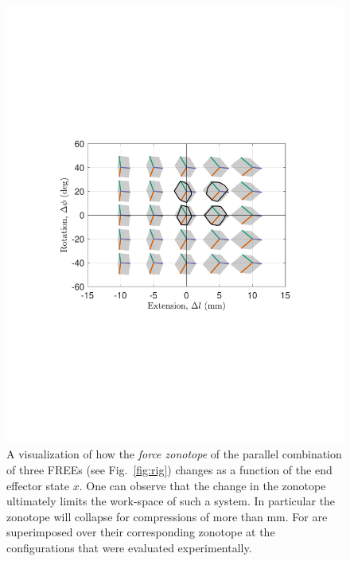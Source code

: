 \begin{figure}
    \centering
    \includegraphics[width=\linewidth]{figures/zntp_vs_x4.pdf}
    \caption{A visualization of how the \emph{force zonotope} of the parallel combination of three FREEs (see Fig.~\ref{fig:rig}) changes as a function of the end effector state $x$. One can observe that the change in the zonotope ultimately limits the work-space of such a system.  In particular the zonotope will collapse for compressions of more than \unit[-10]{mm}.  For  are superimposed over their corresponding zonotope at the configurations that were evaluated experimentally.}
    \label{fig:zntp_vs_x}
\end{figure}















































